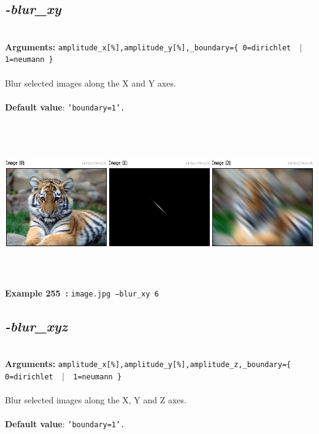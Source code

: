 \documentclass[a4paper,11pt,twoside]{book}
\begin{document}
\subsection{\emph{-blur\_xy} }\vspace*{-0.5em}
~\\\textbf{Arguments: } 
{\small \texttt{amplitude\_x[\%],amplitude\_y[\%],\_boundary=\{ 0=dirichlet ~$|$~ 1=neumann \}}}\\~\\
Blur selected images along the X and Y axes.
~\\~\\\textbf{Default value}: {\small \texttt{'boundary=1'.}}
\begin{center}\includegraphics[keepaspectratio=true,height=7cm,width=\textwidth]{img/gmic_def255.jpg}\\
{\footnotesize \textbf{Example 255~:} \texttt{image.jpg --blur\_xy 6}}
\end{center}

\subsection{\emph{-blur\_xyz} }\vspace*{-0.5em}
~\\\textbf{Arguments: } 
{\small \texttt{amplitude\_x[\%],amplitude\_y[\%],amplitude\_z,\_boundary=\{ 0=dirichlet ~$|$~ 1=neumann \}}}\\~\\
Blur selected images along the X, Y and Z axes.
~\\~\\\textbf{Default value}: {\small \texttt{'boundary=1'.}}
\end{document}
